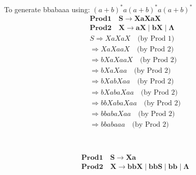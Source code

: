 \documentclass[12pt,a4paper,oneside]{report}
\begin{document}
\section{}
To generate bbabaaa using: $(a + b)^*a(a + b)^*a(a + b)^*$
\begin{equation}
\begin{split}
&\mathbf {Prod 1 \quad S \to XaXaX}\\
&\mathbf {Prod 2 \quad X \to aX \mid bX \mid \Lambda}\\
&S \Longrightarrow XaXaX \quad \text{(by Prod 1)}\\
&\Longrightarrow XaXaaX \quad \text{(by Prod 2)}\\
&\Longrightarrow bXaXaaX \quad \text{(by Prod 2)}\\
&\Longrightarrow bXaXaa \quad \text{(by Prod 2)}\\
&\Longrightarrow bXabXaa \quad \text{(by Prod 2)}\\
&\Longrightarrow bXabaXaa \quad \text{(by Prod 2)}\\
&\Longrightarrow bbXabaXaa \quad \text{(by Prod 2)}\\
&\Longrightarrow bbabaXaa \quad \text{(by Prod 2)}\\
&\Longrightarrow bbabaaa \quad \text{(by Prod 2)}\\
\end{split}
\end{equation}
\section{}
\begin{equation}
\begin{split}
&\mathbf {Prod 1 \quad S \to Xa}\\
&\mathbf {Prod 2 \quad X \to bbX \mid bbS \mid bb\mid\Lambda}\\
\end{split}
\end{equation}
\section{}
\section{}
\begin{equation}
\begin{split}
\end{split}
\end{equation}
\section{}
\section{}
\begin{equation}
\begin{split}
\end{split}
\end{equation}
\section{}
\end{document}
